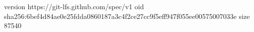 version https://git-lfs.github.com/spec/v1
oid sha256:6bef4d84ae0e25fdda0860187a3c4f2ce27cc9f5eff947f055ee00575007033e
size 87540
